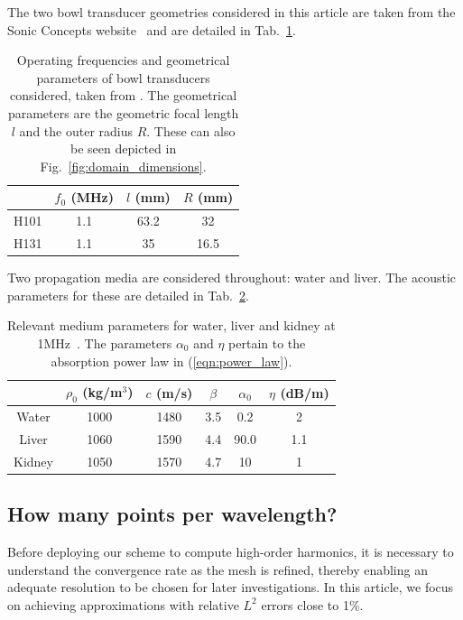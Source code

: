 \documentclass[11pt]{article}
\numberwithin{equation}{section}
\newcommand{\red}[1]{{\color{black} #1}}
\begin{document}
The two bowl transducer geometries considered in this article are taken from 
the Sonic Concepts website~\cite{sonic} and are detailed in Tab.~\ref{tab:transducers}.
\begin{table}[h!]
    \centering
    \begin{tabular}{c  c  c  c}
        \hline\hline
           & $f_0$ (MHz) & $l$ (mm) & $R$ (mm)\\ %
        \hline
        H101 & 1.1 & 63.2 & \red{32} \\ %
        H131 & 1.1 & 35 & \red{16.5} \\ %
        \hline\hline
    \end{tabular}
    \caption{Operating frequencies and geometrical parameters of bowl transducers
    considered, taken from \cite{sonic}. The geometrical parameters are the 
    geometric focal length $l$ and the outer radius $R$.
    These can also be seen depicted in Fig.~\ref{fig:domain_dimensions}.}
    \label{tab:transducers}
\end{table}
Two propagation media are considered throughout: water and liver. The 
acoustic parameters for these are detailed in Tab.~\ref{tab:media}.
\begin{table}[h!]
    \centering
    \begin{tabular}{c  c  c  c  c  c}
        \hline\hline
           & $\rho_0$ (kg/m$^3$) & $c$ (m/s) & $\beta$ & $\alpha_0$ & $\eta$ (dB/m) \\
        \hline
        Water & 1000 & 1480 & 3.5 & 0.2 & 2 \\
        Liver & 1060 & 1590 & 4.4 & 90.0 & 1.1 \\
        Kidney & 1050 & 1570 & 4.7 & 10 & 1 \\
        \hline\hline
    \end{tabular}
    \caption{Relevant medium parameters for water, liver and kidney at 1MHz~\cite{duck2013physical,azhari2010basics}. The parameters 
    $\alpha_0$ and $\eta$ pertain to the absorption power law in (\ref{eqn:power_law}).}
    \label{tab:media}
\end{table}

\subsection{How many points per wavelength?}
Before deploying our scheme to compute high-order harmonics, it is necessary to
understand the convergence rate as the mesh is refined, thereby enabling
an adequate resolution to be chosen for later investigations. In this article, we 
focus on achieving approximations with relative $L^2$ errors close to 1\%. 
\end{document}

